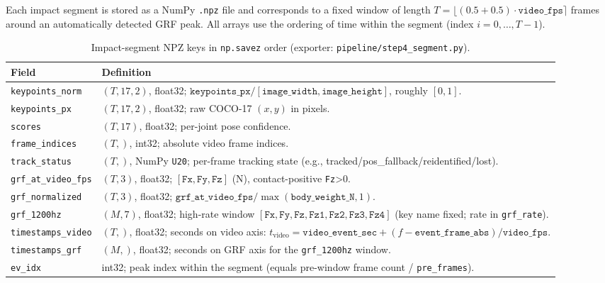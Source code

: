 \documentclass[sigconf,screen]{acmart}
\begin{document}
\iffalse
Each impact segment is stored as a NumPy \texttt{.npz} file and corresponds to a fixed window of length
\(T=\lfloor(0.5+0.5)\cdot \texttt{video\_fps}\rceil\) frames around an automatically detected GRF peak.
All arrays use the ordering of time within the segment (index \(i=0,\dots,T-1\)).

\begin{table}[t]
  \centering
  \small
  \setlength{\tabcolsep}{3pt}
  \renewcommand{\arraystretch}{1.05}
  \caption{Impact-segment NPZ keys in \texttt{np.savez} order (exporter: \texttt{pipeline/step4\_segment.py}).}
  \label{tab:segment_schema}
  \begin{tabularx}{\columnwidth}{@{}lX@{}}
    \toprule
    \textbf{Field} & \textbf{Definition} \\
    \midrule
    \texttt{keypoints\_norm} & \((T,17,2)\), float32; \(\texttt{keypoints\_px}/[\texttt{image\_width},\texttt{image\_height}]\), roughly \([0,1]\). \\
    \texttt{keypoints\_px} & \((T,17,2)\), float32; raw COCO-17 \((x,y)\) in pixels. \\
    \texttt{scores} & \((T,17)\), float32; per-joint pose confidence. \\
    \texttt{frame\_indices} & \((T,)\), int32; absolute video frame indices. \\
    \texttt{track\_status} & \((T,)\), NumPy \texttt{U20}; per-frame tracking state (e.g., tracked/pos\_fallback/reidentified/lost). \\
    \texttt{grf\_at\_video\_fps} & \((T,3)\), float32; \([\texttt{Fx},\texttt{Fy},\texttt{Fz}]\) (N), contact-positive \texttt{Fz}>0. \\
    \texttt{grf\_normalized} & \((T,3)\), float32; \(\texttt{grf\_at\_video\_fps}/\max(\texttt{body\_weight\_N},1)\). \\
    \texttt{grf\_1200hz} & \((M,7)\), float32; high-rate window \([\texttt{Fx},\texttt{Fy},\texttt{Fz},\texttt{Fz1},\texttt{Fz2},\texttt{Fz3},\texttt{Fz4}]\) (key name fixed; rate in \texttt{grf\_rate}). \\
    \texttt{timestamps\_video} & \((T,)\), float32; seconds on video axis: \(t_{\text{video}}=\texttt{video\_event\_sec}+(f-\texttt{event\_frame\_abs})/\texttt{video\_fps}\). \\
    \texttt{timestamps\_grf} & \((M,)\), float32; seconds on GRF axis for the \texttt{grf\_1200hz} window. \\
    \texttt{ev\_idx} & int32; peak index within the segment (equals pre-window frame count / \texttt{pre\_frames}). \\

\end{tabularx}
\end{table}
\end{document}
